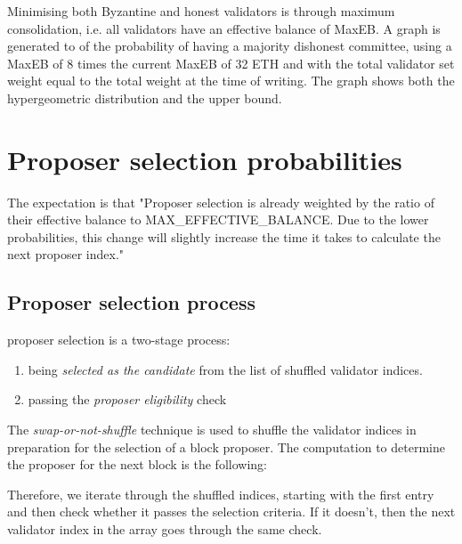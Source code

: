 \documentclass{article}
\begin{document}
Minimising both Byzantine and honest validators is through maximum
consolidation, i.e. all validators have an effective balance of MaxEB. A graph
is generated to of the probability of having a majority dishonest committee,
using a MaxEB of 8 times the current MaxEB of 32 ETH and with the total
validator set weight equal to the total weight at the time of writing. The
graph shows both the hypergeometric distribution and the upper bound.

\section{Proposer selection probabilities}
The expectation is that "Proposer selection is already weighted by the ratio of
their effective balance to MAX\_EFFECTIVE\_BALANCE. Due to the lower
probabilities, this change will slightly increase the time it takes to
calculate the next proposer index."

\subsection{Proposer selection process}

proposer selection is a two-stage process:
\begin{enumerate}
  \item being \emph{selected as the candidate} from the list of shuffled
    validator indices.
  \item passing the \emph{proposer eligibility} check
\end{enumerate}

The \emph{swap-or-not-shuffle} technique is used to shuffle the validator
indices in preparation for the selection of a block proposer.
The computation to determine the proposer for the next block is the following:


Therefore, we iterate through the shuffled indices, starting with the first
entry and then check whether it passes the selection criteria. If it doesn’t,
then the next validator index in the array goes through the same check.
\end{document}
